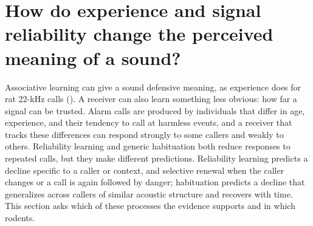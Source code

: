 \section{How do experience and signal reliability change the perceived meaning of a sound?}
\label{sec:q5}


Associative learning can give a sound defensive meaning, as experience does for rat 22-kHz calls (). A receiver can also learn something less obvious: how far a signal can be trusted.
Alarm calls are produced by individuals that differ in age, experience, and their tendency to call at harmless events, and a receiver that tracks these differences can respond strongly to some callers and weakly to others. Reliability learning and generic habituation both reduce responses to repeated calls, but they make different predictions. Reliability learning predicts a decline specific to a caller or context, and selective renewal when the caller changes or a call is again followed by danger; habituation predicts a decline that generalizes across callers of similar acoustic structure and recovers with time. This section asks which of these processes the evidence supports and in which rodents.

